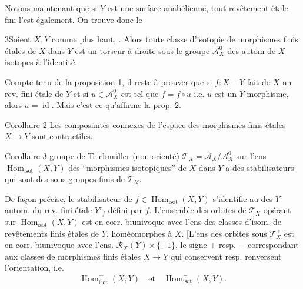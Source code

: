 Notons maintenant que si $Y$ est une surface  anabélienne, tout revêtement étale fini l'est également. On trouve donc le

  3\quad Soient $X,Y$  comme plus haut, .
Alors toute classe d'isotopie de morphismes finis étales de $X$ dans $Y$ est un \uline{torseur} à droite sous le groupe $\mathcal{A}_X^0$ des autom de $X$ isotopes à l'identité.

Compte tenu de la proposition 1, il reste
à prouver que si $f:X\mathbin{-}Y$ fait de $X$ un rev. fini étale de $Y$ et si $u\in\mathcal{A}_X^0$ est tel que $f=f\circ u$ i.e. $u$ est un $Y$-morphisme, alors $u=\operatorname{id}$. Mais c'est ce qu'affirme la prop. 2.

\uline{Corollaire 2} Les composantes connexes de l'espace des morphismes finis étales $X\longrightarrow Y$ sont contractiles.

\uline{Corollaire 3}   groupe de Teichmüller (non orienté) $\mathcal{T}_X=\mathcal{A}_X/\mathcal{A}_X^0$ sur l'ens $\operatorname{Hom}_{\mathrm{isot}}(X,Y)$ des ``morphismes isotopiques'' de $X$ dans $Y$  a des stabilisateurs qui sont des sous-groupes finis de $\mathcal{T}_X$.

De façon précise, le stabilisateur de $f\in\operatorname{Hom}_{\mathrm{isot}}(X,Y)$ s'identifie au    des $Y$-autom. du rev. fini étale $Y'_f$ défini par $f$. L'ensemble des orbites de $\mathcal{T}_X$ opérant sur $\operatorname{Hom}_{\mathrm{isot}}(X,Y)$ est en corr. biunivoque avec l'ens  des classes d'isom. de revêtements finis étales de $Y$, homéomorphes à $X$.
[L'ens des orbites sous $\mathcal{T}_X^+$ est en corr. biunivoque avec l'ens. $\mathcal{R}_X(Y)\times\{\pm1\}$, le signe $+$ resp. $-$ correspondant aux classes de morphismes finis étales $X\longrightarrow Y$
qui conservent resp. renversent l'orientation, i.e.
\[
\operatorname{Hom}_{\mathrm{isot}}^+(X,Y)\quad\text{et}\quad\operatorname{Hom}_{\mathrm{isot}}^-(X,Y).
\]

